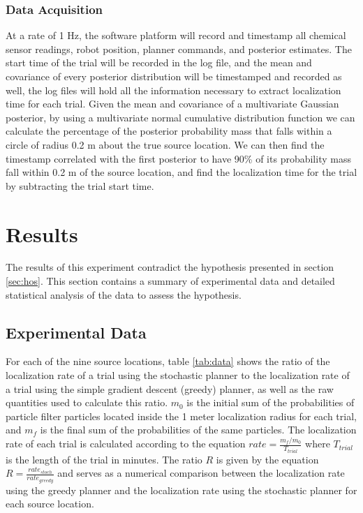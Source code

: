 \documentclass[submit]{aiaa-pretty-modified}
\begin{document}
\subsubsection{Data Acquisition}
At a rate of 1 Hz, the software platform will record and
timestamp all chemical sensor readings, robot position, planner commands, and
posterior estimates. The start time of the trial will be recorded
in the log file, and the mean and covariance of every posterior
distribution will be timestamped and recorded as well, the log files will hold all the
information necessary to extract localization time for each trial.
Given the mean and covariance of a multivariate Gaussian
posterior, by using a multivariate normal cumulative distribution
function we can calculate the percentage of the posterior probability
mass that falls within a circle of radius 0.2 m about the true source
location. We can then find the timestamp correlated with the first
posterior to have 90\% of its probability mass fall within 0.2 m of
the source location, and find the localization time for the trial by
subtracting the trial start time.

\newpage

\section{Results}
\label{sec:results}
The results of this experiment contradict the hypothesis presented in
section \ref{sec:hos}.  This section contains  a summary of experimental data
and detailed statistical analysis of the data to assess the
hypothesis.

\subsection{Experimental Data}
For each of the nine source locations, table \ref{tab:data} shows the
ratio of the localization rate of
a trial using the stochastic planner to the localization rate of
a trial using the simple gradient descent (greedy) planner, as well as
the raw quantities used to calculate this ratio. $m_0$ is the initial sum of
the probabilities of particle filter particles located inside the 1
meter localization radius for each trial, and $m_f$ is the final sum
of the probabilities of the same particles. The localization rate of
each trial is calculated according to the equation $rate =
\frac{m_f/m_0}{T_{trial}}$ where $T_{trial}$ is the length of the
trial in minutes.  The ratio $R$ is given by the equation $R =
\frac{rate_{stoch}}{rate_{greedy}}$ and serves as a numerical
comparison between the localization rate using the greedy planner and
the localization rate using the stochastic planner for each source location.
\end{document}

